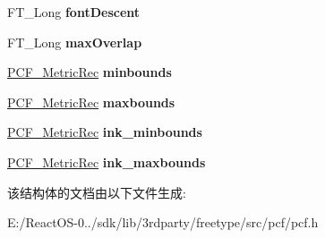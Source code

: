 \begin{DoxyCompactItemize}
F\+T\+\_\+\+Long {\bfseries font\+Descent}
\item 
\mbox{\label{struct_p_c_f___accel_rec___aedc57e23284e064bb5362f2bfeab1532}} 
F\+T\+\_\+\+Long {\bfseries max\+Overlap}
\item 
\mbox{\label{struct_p_c_f___accel_rec___a63fb8842ee23d3c7a2202e2dc4acd863}} 
\hyperlink{struct_p_c_f___metric_rec__}{P\+C\+F\+\_\+\+Metric\+Rec} {\bfseries minbounds}
\item 
\mbox{\label{struct_p_c_f___accel_rec___acd64b758f76caf4954cc3da64a613a60}} 
\hyperlink{struct_p_c_f___metric_rec__}{P\+C\+F\+\_\+\+Metric\+Rec} {\bfseries maxbounds}
\item 
\mbox{\label{struct_p_c_f___accel_rec___a6f15958b404622ea0f7941e57622314a}} 
\hyperlink{struct_p_c_f___metric_rec__}{P\+C\+F\+\_\+\+Metric\+Rec} {\bfseries ink\+\_\+minbounds}
\item 
\mbox{\label{struct_p_c_f___accel_rec___abe21c2b1c2cd8288b0284468ff0abd78}} 
\hyperlink{struct_p_c_f___metric_rec__}{P\+C\+F\+\_\+\+Metric\+Rec} {\bfseries ink\+\_\+maxbounds}
\end{DoxyCompactItemize}


该结构体的文档由以下文件生成\+:\begin{DoxyCompactItemize}
\item 
E\+:/\+React\+O\+S-\/0../sdk/lib/3rdparty/freetype/src/pcf/pcf.\+h\end{DoxyCompactItemize}
